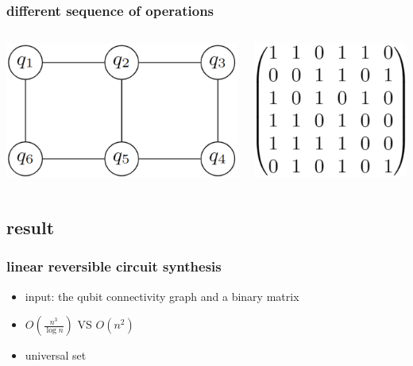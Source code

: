 \begin{frame}
    \frametitle{different sequence of operations}
    \begin{columns}
        \begin{minipage}[c][0.4\textheight][c]{\linewidth}
            \centering
            \includegraphics[width=0.8\linewidth]{figure/example.png}
        \end{minipage}
        
        \begin{minipage}[c][0.4\textheight][c]{\linewidth}
            \centering
            \includegraphics[width=0.8\linewidth]{figure/linear.png}
        \end{minipage}
    \end{columns}
\end{frame}
\subsection{result}
\begin{frame}
    \frametitle{linear reversible circuit synthesis}
    \begin{itemize}
        \item input: the qubit connectivity graph and a binary matrix
        \item $O\left(\frac{n^{3}}{\log {n}} \right)$ VS $O\left(n^{2}\right)$
        \item universal set
    \end{itemize}
\end{frame}